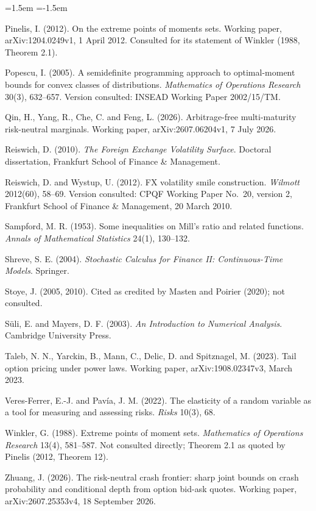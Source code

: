 \documentclass[11pt]{article}
\theoremstyle{remark}
\begin{document}
\begin{list}{}{\leftmargin=1.5em \itemindent=-1.5em \itemsep=2pt \parsep=0pt}
\item Pinelis, I. (2012). On the extreme points of moments sets. Working paper, arXiv:1204.0249v1, 1 April 2012. Consulted for its statement of Winkler (1988, Theorem 2.1).
\item Popescu, I. (2005). A semidefinite programming approach to optimal-moment bounds for convex classes of distributions. \emph{Mathematics of Operations Research} 30(3), 632--657. Version consulted: INSEAD Working Paper 2002/15/TM.
\item Qin, H., Yang, R., Che, C. and Feng, L. (2026). Arbitrage-free multi-maturity risk-neutral marginals. Working paper, arXiv:2607.06204v1, 7 July 2026.
\item Reiswich, D. (2010). \emph{The Foreign Exchange Volatility Surface}. Doctoral dissertation, Frankfurt School of Finance \& Management.
\item Reiswich, D. and Wystup, U. (2012). FX volatility smile construction. \emph{Wilmott} 2012(60), 58--69. Version consulted: CPQF Working Paper No.~20, version 2, Frankfurt School of Finance \& Management, 20 March 2010.
\item Sampford, M. R. (1953). Some inequalities on Mill's ratio and related functions. \emph{Annals of Mathematical Statistics} 24(1), 130--132.
\item Shreve, S. E. (2004). \emph{Stochastic Calculus for Finance II: Continuous-Time Models}. Springer.
\item Stoye, J. (2005, 2010). Cited as credited by Masten and Poirier (2020); not consulted.
\item S\"uli, E. and Mayers, D. F. (2003). \emph{An Introduction to Numerical Analysis}. Cambridge University Press.
\item Taleb, N. N., Yarckin, B., Mann, C., Delic, D. and Spitznagel, M. (2023). Tail option pricing under power laws. Working paper, arXiv:1908.02347v3, March 2023.
\item Veres-Ferrer, E.-J. and Pav\'ia, J. M. (2022). The elasticity of a random variable as a tool for measuring and assessing risks. \emph{Risks} 10(3), 68.
\item Winkler, G. (1988). Extreme points of moment sets. \emph{Mathematics of Operations Research} 13(4), 581--587. Not consulted directly; Theorem 2.1 as quoted by Pinelis (2012, Theorem 12).
\item Zhuang, J. (2026). The risk-neutral crash frontier: sharp joint bounds on crash probability and conditional depth from option bid-ask quotes. Working paper, arXiv:2607.25353v4, 18 September 2026.
\end{list}
\end{document}
